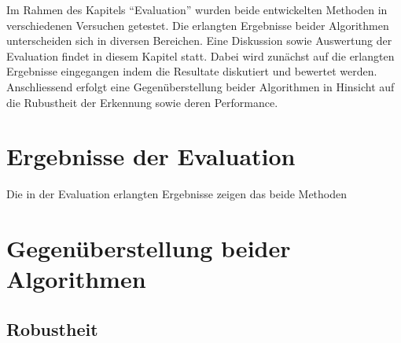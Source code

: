 Im Rahmen des Kapitels \enquote{Evaluation} wurden beide entwickelten Methoden in verschiedenen Versuchen getestet. Die erlangten Ergebnisse beider Algorithmen unterscheiden sich in diversen Bereichen. Eine Diskussion sowie Auswertung der Evaluation findet in diesem Kapitel statt. Dabei wird zunächst auf die erlangten Ergebnisse eingegangen indem die Resultate diskutiert und bewertet werden. Anschliessend erfolgt eine Gegenüberstellung beider Algorithmen in Hinsicht auf die Rubustheit der Erkennung sowie deren Performance.

\section{Ergebnisse der Evaluation}
\label{sec:anforderunsevaluierung}

Die in der Evaluation erlangten Ergebnisse zeigen das beide Methoden 







% 

\section{Gegenüberstellung beider Algorithmen}
\label{sec:gegenueberstellung}

\subsection{Robustheit}
\label{subsec:discussion_robsutness}


